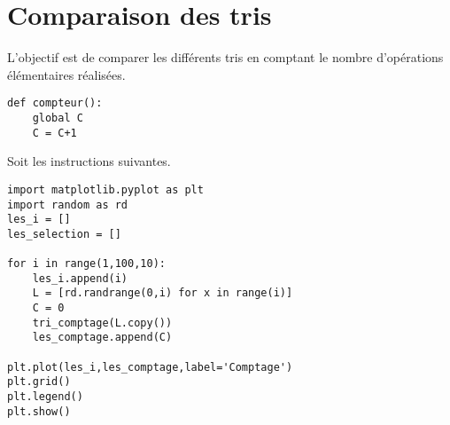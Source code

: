 \documentclass[
	fontsize=10pt, %
	twoside=true, %
]{kaobook}
\newcommand{\repRel}{../../..}
\newcommand{\repStyle}{\repRel/Style}
\begin{document}
\iflivret {} \else
\ifprof  {} \else \fi
\fi


\proftrue
\renewcommand{\repExo}{\repRel/Informatique/Exercices/S1_08_Tris/}
\renewcommand{\nomExo}{04_TriComptage}
\graphicspath{{\repStyle/png}{\repExo\nomExo/images}}


\renewcommand{\repExo}{\repRel/Informatique/Exercices/S1_08_Tris/}
\renewcommand{\nomExo}{02_TriFusion}
\graphicspath{{\repStyle/png}{\repExo\nomExo/images}}



\section*{Comparaison des tris}

\begin{obj}
L'objectif est de comparer les différents tris en comptant le nombre d'opérations élémentaires réalisées.
\end{obj}




\begin{lstlisting}
def compteur():
    global C
    C = C+1	
\end{lstlisting}


Soit les instructions suivantes.
\begin{lstlisting}
import matplotlib.pyplot as plt
import random as rd
les_i = []
les_selection = []

for i in range(1,100,10):
    les_i.append(i)
    L = [rd.randrange(0,i) for x in range(i)]
    C = 0
    tri_comptage(L.copy())
    les_comptage.append(C)

plt.plot(les_i,les_comptage,label='Comptage')
plt.grid()
plt.legend()
plt.show()
\end{lstlisting}

\end{document}

